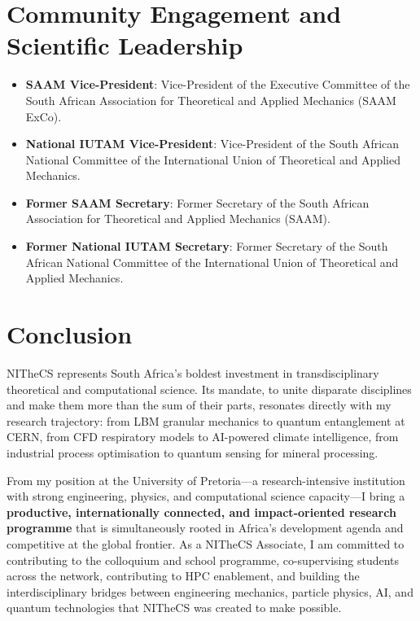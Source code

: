 \documentclass[11pt,a4paper]{article}
\begin{document}
\section{Community Engagement and Scientific Leadership}

\begin{itemize}
  \item \textbf{SAAM Vice-President}: Vice-President of the Executive Committee of the South African Association for Theoretical and Applied Mechanics (SAAM ExCo).
  \item \textbf{National IUTAM Vice-President}: Vice-President of the South African National Committee of the International Union of Theoretical and Applied Mechanics.
  \item \textbf{Former SAAM Secretary}: Former Secretary of the South African Association for Theoretical and Applied Mechanics (SAAM).
  \item \textbf{Former National IUTAM Secretary}: Former Secretary of the South African National Committee of the International Union of Theoretical and Applied Mechanics.
\end{itemize}

\section{Conclusion}

NITheCS represents South Africa's boldest investment in transdisciplinary theoretical and computational science. Its mandate, to unite disparate disciplines and make them more than the sum of their parts, resonates directly with my research trajectory: from LBM granular mechanics to quantum entanglement at CERN, from CFD respiratory models to AI-powered climate intelligence, from industrial process optimisation to quantum sensing for mineral processing.

From my position at the University of Pretoria---a research-intensive institution with strong engineering, physics, and computational science capacity---I bring a \textbf{productive, internationally connected, and impact-oriented research programme} that is simultaneously rooted in Africa's development agenda and competitive at the global frontier. As a NITheCS Associate, I am committed to contributing to the colloquium and school programme, co-supervising students across the network, contributing to HPC enablement, and building the interdisciplinary bridges between engineering mechanics, particle physics, AI, and quantum technologies that NITheCS was created to make possible.
\end{document}
